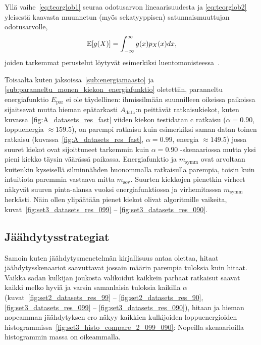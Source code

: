 Yllä vaihe~\eqref{eq:teorglob1} seuraa odotusarvon lineaarisuudesta ja \eqref{eq:teorglob2} yleisestä kaavasta muunnetun (myös sekatyyppisen) satunnaismuuttujan odotusarvolle,
\begin{equation*}
    \mathrm{E} [g(X)] = \int_{-\infty}^{\infty} g(x) p_X(x) dx,
\end{equation*}
joiden tarkemmat perustelut löytyvät esimerkiksi luentomonisteessa~\cite{koistinen2013}.

Toisaalta kuten jaksoissa~\ref{sub:energiamaasto} ja \ref{sub:paranneltu_monen_kiekon_energiafunktio} oletettiin, paranneltu energiafunktio $E_\text{par}$ ei ole täydellinen:
ihmissilmään suunnilleen oikeissa paikoissa sijaitsevat mutta hieman epätarkasti $A_\text{data}$:n peittävät ratkaisukiekot, kuten kuvassa~\ref{fig:A_datasets_res_fast} viiden kiekon testidatan c ratkaisu ($\alpha = 0.90$, loppuenergia $\approx 159.5$), on parempi ratkaisu kuin esimerkiksi saman datan toinen ratkaisu (kuvassa~\ref{fig:A_datasets_res_fast}, $\alpha = 0.99$, energia $\approx 149.5$)
jossa suuret kiekot ovat sijoittuneet tarkemmin kuin $\alpha = 0.90$ -skenaariossa mutta yksi pieni kiekko täysin väärässä paikassa.
Energiafunktio ja $m_\text{symm}$ ovat arvoltaan kuitenkin kyseisellä silminnähden huonommalla ratkaisulla parempia, toisin kuin intuitiota paremmin vastaava mitta $m_\text{sov}$.
Suurten kiekkojen pienetkin virheet näkyvät suuren pinta-alansa vuoksi energiafunktiossa ja virhemitasssa $m_\text{symm}$ herkästi.
Näin ollen ylipäätään pienet kiekot olivat algoritmille vaikeita, kuvat~\ref{fig:set3_datasets_res_099} -- \ref{fig:set3_datasets_res_090}.

\subsection{Jäähdytysstrategiat}
\label{sub:pohdinta_jaahdytysstrategiat}

Samoin kuten jäähdytysmenetelmän kirjallisuus antaa olettaa, hitaat jäähdytysskenaariot saavuttavat jossain määrin parempia tuloksia kuin hitaat.
Vaikka sadan kulkijan joukosta valikoidut kaikkein parhaat ratkaisut saavat kaikki melko hyviä ja varsin samanlaisia tuloksia kaikilla $\alpha$ (kuvat~\ref{fig:set2_datasets_res_99} -- \ref{fig:set2_datasets_res_90}, \ref{fig:set3_datasets_res_099} -- \ref{fig:set3_datasets_res_090}), hitaan ja hieman nopeamman jäähdytyksen ero näkyy kaikkien kulkijoiden loppuenergioiden histogrammissa~\ref{fig:set3_histo_compare_2_099_090}:
Nopeilla skenaarioilla histogrammin massa on oikeammalla.

